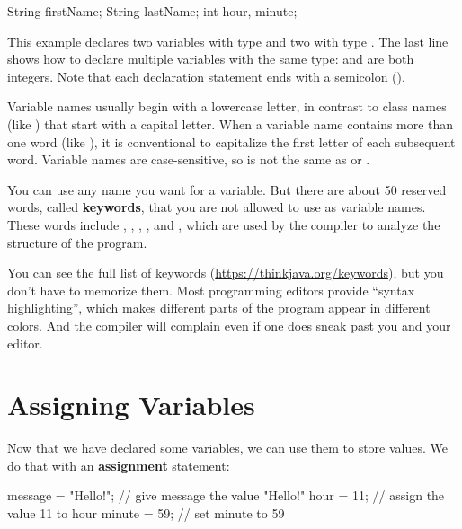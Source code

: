 \begin{code}
String firstName;
String lastName;
int hour, minute;
\end{code}

This example declares two variables with type  and two with type .
The last line shows how to declare multiple variables with the same type:  and  are both integers.
Note that each declaration statement ends with a semicolon (\java{;}).


Variable names usually begin with a lowercase letter, in contrast to class names (like ) that start with a capital letter.
When a variable name contains more than one word (like ), it is conventional to capitalize the first letter of each subsequent word.
Variable names are case-sensitive, so  is not the same as  or .


You can use any name you want for a variable.
But there are about 50 reserved words, called {\bf keywords}, that you are not allowed to use as variable names.
These words include , , , , and , which are used by the compiler to analyze the structure of the program.

You can see the full list of keywords (\url{https://thinkjava.org/keywords}), but you don't have to memorize them.
Most programming editors provide ``syntax highlighting'', which makes different parts of the program appear in different colors.
And the compiler will complain even if one does sneak past you and your editor.



\section{Assigning Variables}


Now that we have declared some variables, we can use them to store values.
We do that with an {\bf assignment} statement:

\begin{code}
message = "Hello!";  // give message the value "Hello!"
hour = 11;           // assign the value 11 to hour
minute = 59;         // set minute to 59
\end{code}

